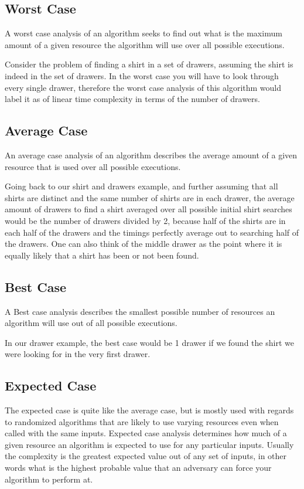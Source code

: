 \documentclass[12pt, letterpaper]{book}
\begin{document}
		\subsection{Worst Case}

	A worst case analysis of an algorithm seeks to find out what is the maximum amount of a given resource the algorithm will use over all possible executions.

	Consider the problem of finding a shirt in a set of drawers, assuming the shirt is indeed in the set of drawers. In the worst case you will have to look through every single drawer, therefore the worst case analysis of this algorithm would label it as of linear time complexity in terms of the number of drawers.

		\subsection{Average Case}

An average case analysis of an algorithm describes the average amount of a given resource that is used over all possible executions.

	Going back to our shirt and drawers example, and further assuming that all shirts are distinct and the same number of shirts are in each drawer, the average amount of drawers to find a shirt averaged over all possible initial shirt searches would be the number of drawers divided by 2, because half of the shirts are in each half of the drawers and the timings perfectly average out to searching half of the drawers. One can also think of the middle drawer as the point where it is equally likely that a shirt has been or not been found.

		\subsection{Best Case}

A Best case analysis describes the smallest possible number of resources an algorithm will use out of all possible executions.

	In our drawer example, the best case would be 1 drawer if we found the shirt we were looking for in the very first drawer.

		\subsection{Expected Case}

The expected case is quite like the average case, but is mostly used with regards to randomized algorithms that are likely to use varying resources even when called with the same inputs. Expected case analysis determines how much of a given resource an algorithm is expected to use for any particular inputs. Usually the complexity is the greatest expected value out of any set of inputs, in other words what is the highest probable value that an adversary can force your algorithm to perform at.
	
\end{document}
